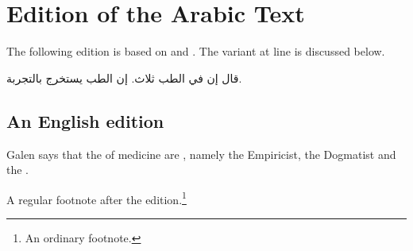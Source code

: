 \documentclass[../main.tex]{subfiles}
\begin{document}
\chapter{Edition of the Arabic Text}\label{chap:edition}

The following edition is based on  and .
The variant at line  is discussed below.

\begin{Arabic}
\beginnumbering
\pstart
قال  إن
في الطب ثلاث.
\pend
\pstart
{}
إن الطب يستخرج بالتجربة.
\pend
\endnumbering
\end{Arabic}

\section{An English edition}

\beginnumbering
\pstart
Galen says that the  of
medicine are , namely the Empiricist, the Dogmatist and the
.
\pend
\endnumbering

A regular footnote after the edition.\footnote{An ordinary footnote.}
\end{document}
